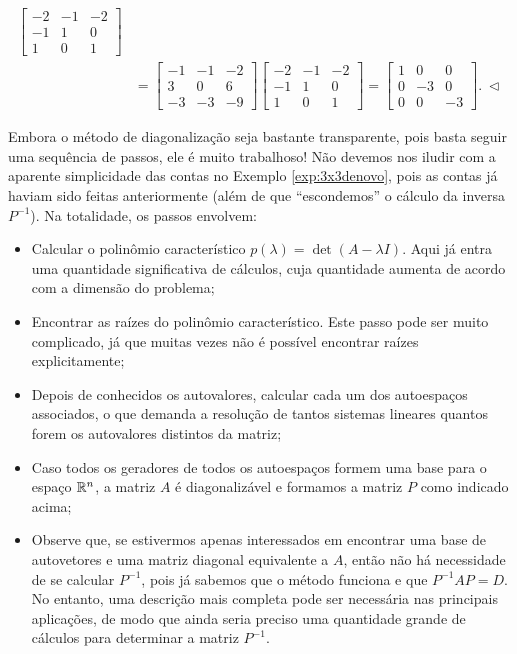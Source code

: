 \documentclass[../livro.tex]{subfiles}  %
\begin{document}
\begin{example}
\begin{align*}
\begin{bmatrix}
	-2&-1&-2 \\ -1&1&0 \\ 1&0&1
	\end{bmatrix} \\
	& =
	\begin{bmatrix}
	-1&-1&-2 \\ 3&0&6 \\ -3&-3&-9
	\end{bmatrix}
	\begin{bmatrix}
	-2&-1&-2 \\ -1&1&0 \\ 1&0&1
	\end{bmatrix} =
	\begin{bmatrix}
	1&0&0 \\ 0&-3&0 \\ 0&0&-3
	\end{bmatrix}. \ \lhd
          \end{align*}
\end{example}

Embora o método de diagonalização seja bastante transparente, pois basta seguir uma sequência de passos, ele é muito trabalhoso! Não devemos nos iludir com a aparente simplicidade das contas no Exemplo \ref{exp:3x3denovo}, pois as contas já haviam sido feitas anteriormente (além de que ``escondemos'' o cálculo da inversa $P^{-1}$). Na totalidade, os passos envolvem:
\begin{itemize}
\item Calcular o polinômio característico $p(\lambda) = \det (A - \lambda I)$. Aqui já entra uma quantidade significativa de cálculos, cuja quantidade aumenta de acordo com a dimensão do problema;
\item Encontrar as raízes do polinômio característico. Este passo pode ser muito complicado, já que muitas vezes não é possível encontrar raízes explicitamente;
\item Depois de conhecidos os autovalores, calcular cada um dos autoespaços associados, o que demanda a resolução de tantos sistemas lineares quantos forem os autovalores distintos da matriz;
\item Caso todos os geradores de todos os autoespaços formem uma base para o espaço $\mathbb{R}^n$, a matriz $A$ é diagonalizável e formamos a matriz $P$ como indicado acima;
\item Observe que, se estivermos apenas interessados em encontrar uma base de autovetores e uma matriz diagonal equivalente a $A$, então não há necessidade de se calcular $P^{-1}$, pois já sabemos que o método funciona e que $P^{-1} AP = D$. No entanto, uma descrição mais completa pode ser necessária nas principais aplicações, de modo que ainda seria preciso uma quantidade grande de cálculos para determinar a matriz $P^{-1}$.
\end{itemize}
\end{document}
